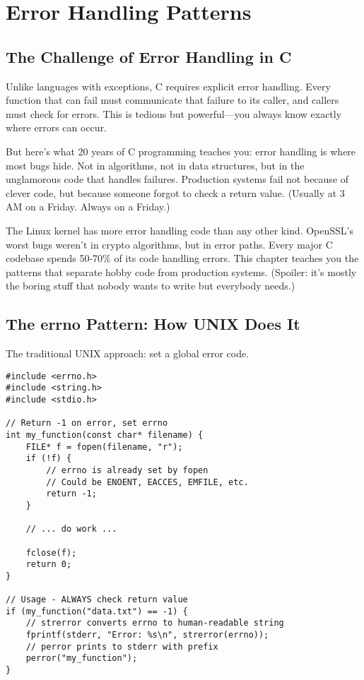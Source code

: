 \chapter{Error Handling Patterns}

\section{The Challenge of Error Handling in C}

Unlike languages with exceptions, C requires explicit error handling. Every function that can fail must communicate that failure to its caller, and callers must check for errors. This is tedious but powerful---you always know exactly where errors can occur.

But here's what 20 years of C programming teaches you: error handling is where most bugs hide. Not in algorithms, not in data structures, but in the unglamorous code that handles failures. Production systems fail not because of clever code, but because someone forgot to check a return value. (Usually at 3 AM on a Friday. Always on a Friday.)

The Linux kernel has more error handling code than any other kind. OpenSSL's worst bugs weren't in crypto algorithms, but in error paths. Every major C codebase spends 50-70\% of its code handling errors. This chapter teaches you the patterns that separate hobby code from production systems. (Spoiler: it's mostly the boring stuff that nobody wants to write but everybody needs.)

\section{The errno Pattern: How UNIX Does It}

The traditional UNIX approach: set a global error code.

\begin{lstlisting}
#include <errno.h>
#include <string.h>
#include <stdio.h>

// Return -1 on error, set errno
int my_function(const char* filename) {
    FILE* f = fopen(filename, "r");
    if (!f) {
        // errno is already set by fopen
        // Could be ENOENT, EACCES, EMFILE, etc.
        return -1;
    }

    // ... do work ...

    fclose(f);
    return 0;
}

// Usage - ALWAYS check return value
if (my_function("data.txt") == -1) {
    // strerror converts errno to human-readable string
    fprintf(stderr, "Error: %s\n", strerror(errno));
    // perror prints to stderr with prefix
    perror("my_function");
}
\end{lstlisting}


